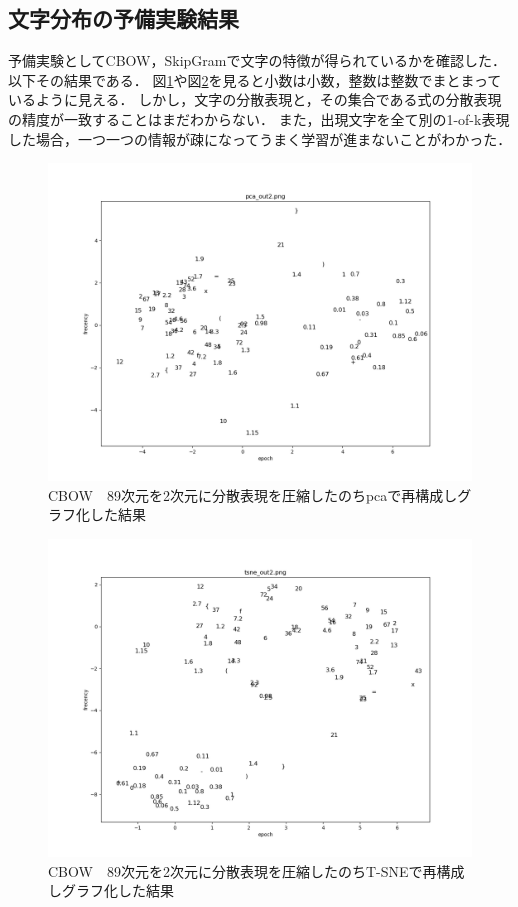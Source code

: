 \documentclass[a4j,11pt,report]{jsbook}
\begin{document}
\subsection{文字分布の予備実験結果}
予備実験としてCBOW，SkipGramで文字の特徴が得られているかを確認した．
以下その結果である．
図\ref{fig:89x2cbow_pac}や図\ref{fig:89x2cbow_tsne}を見ると小数は小数，整数は整数でまとまっているように見える．
しかし，文字の分散表現と，その集合である式の分散表現の精度が一致することはまだわからない．
また，出現文字を全て別の1-of-k表現した場合，一つ一つの情報が疎になってうまく学習が進まないことがわかった．
\begin{center}
  \begin{figure}[H]
    \centering
    \includegraphics[width=\linewidth]{image/pca_out2.png}
    \caption{CBOW　89次元を2次元に分散表現を圧縮したのちpcaで再構成しグラフ化した結果}
    \label{fig:89x2cbow_pac}
  \end{figure}
\end{center}


\begin{center}
  \begin{figure}[H]
    \centering
    \includegraphics[width=\linewidth]{image/tsne_out2.png}
    \caption{CBOW　89次元を2次元に分散表現を圧縮したのちT-SNEで再構成しグラフ化した結果}
    \label{fig:89x2cbow_tsne}
  \end{figure}
\end{center}
\end{document}
